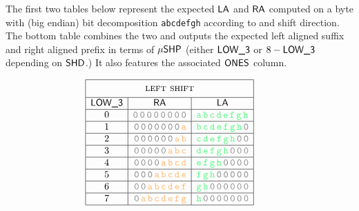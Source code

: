 The first two tables below represent the expected $\textsf{LA}$ and $\textsf{RA}$ computed on a byte with (big endian) bit decomposition \texttt{abcdefgh} according to \LT{} and shift direction. The bottom table combines the two and outputs the expected left aligned suffix and right aligned prefix in terms of $\textsf{$\mu$SHP}{}$ (either $\textsf{LOW\_3}$ or $8-\textsf{LOW\_3}$ depending on $\textsf{SHD}$.) It also features the associated $\textsf{ONES}{}$ column.

\begin{figure}[!h]
\renewcommand{\arraystretch}{1.2}
\[
    \begin{array}{|c|r|l|} \hline
        \multicolumn{3}{|c|}{\phantom{\Big(}\textsc{left shift}\phantom{\Big(}} \\ \hline
        \LT{} & \multicolumn{1}{c|}{\ra} & \multicolumn{1}{c|}{\la} \\ \hline
        0
        &\yellowm{\mathtt{\lightGray{0\,0\,0\,0\,0\,0\,0\,0}}}
        &\color{draculagreen}{\mathtt{a\,b\,c\,d\,e\,f\,g\,h}}
        \\ \hline
        1
        &\yellowm{\texttt{\lightGray{0\,0\,0\,0\,0\,0\,0}\,a}}
        &\color{draculagreen}\texttt{b\,c\,d\,e\,f\,g\,h\,\lightGray{0}}
        \\ \hline
        2
        &\yellowm{\texttt{\lightGray{0\,0\,0\,0\,0\,0}\,a\,b}}
        &\color{draculagreen}\texttt{c\,d\,e\,f\,g\,h\,\lightGray{0\,0}}
        \\ \hline
        3
        &\yellowm{\texttt{\lightGray{0\,0\,0\,0\,0}\,a\,b\,c}}
        &\color{draculagreen}\texttt{d\,e\,f\,g\,h\,\lightGray{0\,0\,0}}
        \\ \hline
        4
        &\yellowm{\texttt{\lightGray{0\,0\,0\,0}\,a\,b\,c\,d}}
        &\color{draculagreen}\texttt{e\,f\,g\,h\,\lightGray{0\,0\,0\,0}}
        \\ \hline
        5
        &\yellowm{\texttt{\lightGray{0\,0\,0}\,a\,b\,c\,d\,e}}
        &\color{draculagreen}\texttt{f\,g\,h\,\lightGray{0\,0\,0\,0\,0}}
        \\ \hline
        6
        &\yellowm{\texttt{\lightGray{0\,0}\,a\,b\,c\,d\,e\,f}}
        &\color{draculagreen}\texttt{g\,h\,\lightGray{0\,0\,0\,0\,0\,0}}
        \\ \hline
        7
        &\yellowm{\texttt{\lightGray{0}\,a\,b\,c\,d\,e\,f\,g}}
        &\color{draculagreen}\texttt{h\,\lightGray{0\,0\,0\,0\,0\,0\,0}}
        \\ \hline
    \end{array}
    \qquad
    \begin{array}{|c|r|l|}

\end{array}\]
\end{figure}
